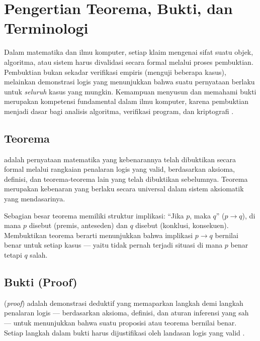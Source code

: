 \section{Pengertian Teorema, Bukti, dan Terminologi}

Dalam matematika dan ilmu komputer, setiap klaim mengenai sifat suatu objek, algoritma, atau sistem harus divalidasi secara formal melalui proses pembuktian. Pembuktian bukan sekadar verifikasi empiris (menguji beberapa kasus), melainkan demonstrasi logis yang menunjukkan bahwa suatu pernyataan berlaku untuk \emph{seluruh} kasus yang mungkin. Kemampuan menyusun dan memahami bukti merupakan kompetensi fundamental dalam ilmu komputer, karena pembuktian menjadi dasar bagi analisis algoritma, verifikasi program, dan kriptografi \cite{rosen2019}.

\subsection{Teorema}

\begin{definisi}[Teorema]
 adalah pernyataan matematika yang kebenarannya telah dibuktikan secara formal melalui rangkaian penalaran logis yang valid, berdasarkan aksioma, definisi, dan teorema-teorema lain yang telah dibuktikan sebelumnya. Teorema merupakan kebenaran yang berlaku secara universal dalam sistem aksiomatik yang mendasarinya.
\end{definisi}

Sebagian besar teorema memiliki struktur implikasi: ``Jika $p$, maka $q$'' ($p \rightarrow q$), di mana $p$ disebut  (premis, anteseden) dan $q$ disebut  (konklusi, konsekuen). Membuktikan teorema berarti menunjukkan bahwa implikasi $p \rightarrow q$ bernilai benar untuk setiap kasus --- yaitu tidak pernah terjadi situasi di mana $p$ benar tetapi $q$ salah.

\subsection{Bukti (Proof)}

\begin{definisi}[Bukti]
 (\textit{proof}) adalah demonstrasi deduktif yang memaparkan langkah demi langkah penalaran logis --- berdasarkan aksioma, definisi, dan aturan inferensi yang sah --- untuk menunjukkan bahwa suatu proposisi atau teorema bernilai benar. Setiap langkah dalam bukti harus dijustifikasi oleh landasan logis yang valid \cite{velleman2019}.
\end{definisi}

